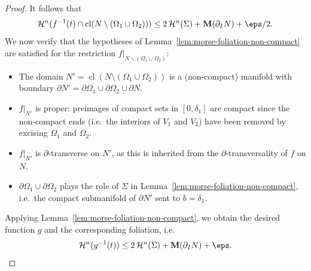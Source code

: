 \begin{proof}
        It follows that
        \begin{equation*}
            \mathcal{H}^n(f^{-1}(t) \cap \operatorname{cl}(N\setminus(\Omega_1\cup\Omega_2))) \leq 2\,\mathcal{H}^n(\Sigma) + \mathbf{M}(\partial_I N) + \eps/2.
        \end{equation*}
        We now verify that the hypotheses of Lemma~\ref{lem:morse-foliation-non-compact} are satisfied for the restriction $f|_{N\backslash(\Omega_1\cup\Omega_2)}$:
        \begin{itemize}
            \item The domain $N' = \operatorname{cl}(N \setminus (\Omega_1 \cup \Omega_2))$ is a (non-compact) manifold with boundary $\partial N' = \partial\Omega_1 \cup \partial\Omega_2 \cup \partial N$.
            \item $f|_{N'}$ is proper: preimages of compact sets in $[0, \delta_1]$ are compact since the non-compact ends (i.e.\ the interiors of $V_1$ and $V_2$) have been removed by excising $\Omega_1$ and $\Omega_2$.
            \item $f|_{N'}$ is $\partial$-transverse on $N'$, as this is inherited from the $\partial$-transversality of $f$ on $N$.
            \item $\partial\Omega_1 \cup \partial\Omega_2$ plays the role of $\Sigma$ in Lemma~\ref{lem:morse-foliation-non-compact}, i.e.\ the compact submanifold of $\partial N'$ sent to $b = \delta_1$.
        \end{itemize}
        Applying Lemma~\ref{lem:morse-foliation-non-compact}, we obtain the desired function $g$ and the corresponding foliation, i.e.
        \begin{equation*}
            \mathcal{H}^n(g^{-1}(t)) \leq 2\,\mathcal{H}^n(\Sigma) + \mathbf{M}(\partial_I N) + \eps.
        \end{equation*}
    \end{proof}
